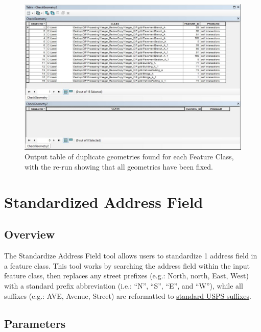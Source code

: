 \documentclass[openany]{book}
\theoremstyle{definition}
\theoremstyle{definition}
\theoremstyle{definition}
\theoremstyle{remark}
\begin{document}
\begin{figure}[H]

{\centering \includegraphics{figures/chkG-after} 

}

\caption{Output table of duplicate geometries found for each Feature Class, with the re-run showing that all geometries have been fixed.}\label{fig:chkGafter}
\end{figure}

\hypertarget{stdAdd1}{\chapter{Standardized Address
Field}\label{stdAdd1}}

\section{Overview}\label{overview-6}

The Standardize Address Field tool allows users to standardize 1 address
field in a feature class. This tool works by searching the address field
within the input feature class, then replaces any street prefixes (e.g.:
North, north, East, West) with a standard prefix abbreviation (i.e.:
``N'', ``S'', ``E'', and ``W''), while all suffixes (e.g.: AVE, Avenue,
Street) are reformatted to
\href{https://github.com/allanbreyes/udacity-data-science/blob/master/p2/data/suffixes.csv}{standard
USPS suffixes}.

\section{Parameters}\label{parameters-6}
\end{document}
